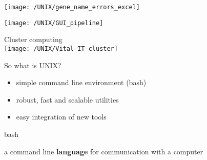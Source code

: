 \documentclass[xcolor=dvipsnames]{beamer}
\begin{document}
\begin{frame}
	\begin{center}
		\texttt{[image: /UNIX/gene\_name\_errors\_excel]}
	\end{center}
\end{frame}


\begin{frame}
	\begin{center}
		\texttt{[image: /UNIX/GUI\_pipeline]}
	\end{center}
\end{frame}


\begin{frame}
	\begin{center}
		\Huge
		Cluster computing\\
		\vspace{1cm}
		\texttt{[image: /UNIX/Vital-IT-cluster]}
	\end{center}
\end{frame}

\begin{frame}
	\Huge
	\begin{center}
		So what is UNIX?
	\end{center}
	\Large
	\pause
	\begin{itemize}
		\item simple command line environment (bash)
		\item robust, fast and scalable utilities
		\item easy integration of new tools
	\end{itemize}
\end{frame}

\begin{frame}
	\Huge
	\begin{center}
		bash
	\end{center}
	\large
	a command line \textbf{language} for communication with a computer
\end{frame}
\end{document}
